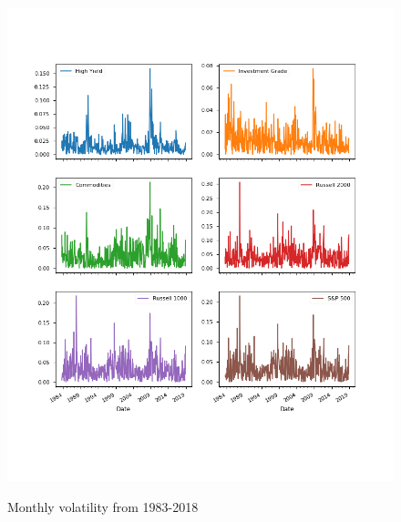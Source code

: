 \documentclass[11pt,a4paper,oneside]{article}
\begin{document}
\clearpage

\begin{figure}[ht]
\center
\caption{Monthly volatility from 1983-2018}
\vspace{-0mm}
\label{mth_vol}
\includegraphics[width=\textwidth,height=\textheight,keepaspectratio]{images/mth_vol.png}
\begingroup
\vspace{-14mm}
\endgroup
\end{figure}

\clearpage
\end{document}
